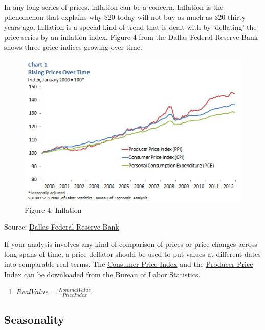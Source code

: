 \documentclass[
  letterpaper,
  DIV=11,
  numbers=noendperiod]{scrreprt}
\providecommand{\tightlist}{%
  \setlength{\itemsep}{0pt}\setlength{\parskip}{0pt}}\usepackage{longtable,booktabs,array}
\begin{document}
In any long series of prices, inflation can be a concern. Inflation is
the phenomenon that explains why \$20 today will not buy as much as \$20
thirty years ago. Inflation is a special kind of trend that is dealt
with by `deflating' the price series by an inflation index. Figure 4
from the Dallas Federal Reserve Bank shows three price indices growing
over time.

\begin{figure}

{\centering \includegraphics{images/dallasfednominal_c1.png}

}

\caption{Figure 4: Inflation}

\end{figure}

Source:
\href{http://www.dallasfed.org/research/basics/nominal.cfm}{Dallas
Federal Reserve Bank}

If your analysis involves any kind of comparison of prices or price
changes across long spans of time, a price deflator should be used to
put values at different dates into comparable real terms. The
\href{http://www.bls.gov/cpi/data.htm}{Consumer Price Index} and the
\href{http://www.bls.gov/ppi/data.htm}{Producer Price Index} can be
downloaded from the Bureau of Labor Statistics.

\begin{enumerate}
\def\labelenumi{(\arabic{enumi})}
\setcounter{enumi}{1}
\tightlist
\item
  \(Real Value = \frac{Nominal Value}{Price Index}\)
\end{enumerate}

\hypertarget{seasonality}{%
\subsection{Seasonality}\label{seasonality}}
\end{document}
